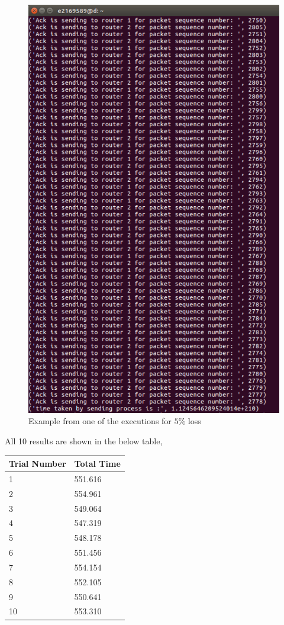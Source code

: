 \documentclass[conference]{IEEEtran}
\begin{document}
\begin{figure}[H]
    \centering
    \includegraphics[scale=0.13]{exp2.png}
    \caption{Example from one of the executions for $5\%$ loss}
\end{figure}

All 10 results are shown in the below table,

\begin{table}[H]
\begin{tabular}{|l|l|}
\hline
Trial Number & Total Time \\ \hline
1            & 551.616    \\ \hline
2            & 554.961    \\ \hline
3            & 549.064    \\ \hline
4            & 547.319    \\ \hline
5            & 548.178    \\ \hline
6            & 551.456    \\ \hline
7            & 554.154    \\ \hline
8            & 552.105    \\ \hline
9            & 550.641    \\ \hline
10           & 553.310    \\ \hline
\end{tabular}
\end{table}
\end{document}
